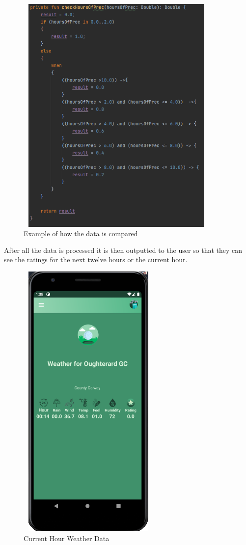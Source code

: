 \begin{figure}[H]
    \centering
    \includegraphics[width=10cm,height = 12cm]{img/DataComparisonExample.PNG}
    \caption{Example of how the data is compared}
    \label{fig:altas config}
\end{figure}

After all the data is processed it is then outputted to the user so that they can see the ratings for the next twelve hours or the current hour.

\begin{figure}[H]
    \centering
    \includegraphics[width=7cm,height = 14cm]{img/CurrentDataOutput.PNG}
    \caption{Current Hour Weather Data}
    \label{fig:altas config}
\end{figure}

